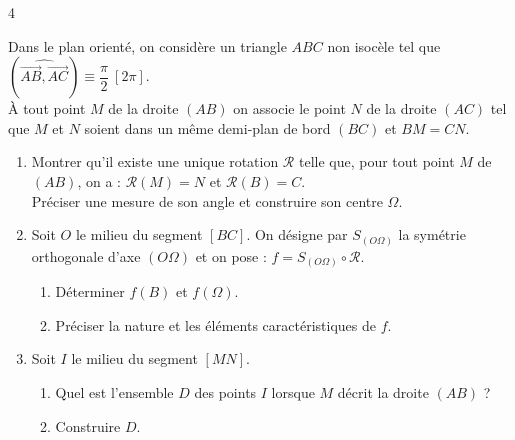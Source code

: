 \documentclass{axiobac}
\begin{document}
\begin{exercice}{4}

Dans le plan orienté, on considère un triangle $ABC$ non isocèle tel que $\left(\widehat{\overrightarrow{AB}, \overrightarrow{AC}}\right) \equiv \dfrac{\pi}{2} \ [2\pi]$. \\
À tout point $M$ de la droite $(AB)$ on associe le point $N$ de la droite $(AC)$ tel que $M$ et $N$ soient dans un même demi-plan de bord $(BC)$ et $BM = CN$.

\begin{enumerate}
    \item Montrer qu'il existe une unique rotation $\mathcal{R}$ telle que, pour tout point $M$ de $(AB)$, on a : $\mathcal{R}(M) = N$ et $\mathcal{R}(B) = C$. \\
    Préciser une mesure de son angle et construire son centre $\Omega$.
    \item Soit $O$ le milieu du segment $[BC]$. On désigne par $S_{(O\Omega)}$ la symétrie orthogonale d'axe $(O\Omega)$ et on pose : $f = S_{(O\Omega)} \circ \mathcal{R}$.
    \begin{enumerate}
        \item Déterminer $f(B)$ et $f(\Omega)$.
        \item Préciser la nature et les éléments caractéristiques de $f$.
    \end{enumerate}
    \item Soit $I$ le milieu du segment $[MN]$.
    \begin{enumerate}
        \item Quel est l'ensemble $D$ des points $I$ lorsque $M$ décrit la droite $(AB)$ ?
        \item Construire $D$.
    \end{enumerate}
\end{enumerate}

\end{exercice}
\end{document}
